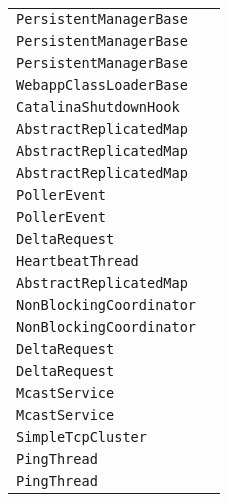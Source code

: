 \begin{center}
\begin{tabular}{ll}
\lstinline/PersistentManagerBase/&\raisebox{0pt}{\lstinline/ startInternal())/}\\ 
\lstinline/PersistentManagerBase/&\raisebox{0pt}{\lstinline/ startInternal())/}\\ 
\lstinline/PersistentManagerBase/&\raisebox{0pt}{\lstinline/ startInternal())/}\\ 
\lstinline/WebappClassLoaderBase/&\raisebox{0pt}{\lstinline/ findClassInternal(String)/}\\ 
\lstinline/CatalinaShutdownHook/&\raisebox{0pt}{\lstinline/ run()/}\\ 
\lstinline/AbstractReplicatedMap/&\raisebox{0pt}{\lstinline/ Vput()/}\\ 
\lstinline/AbstractReplicatedMap/&\raisebox{0pt}{\lstinline/ Vput()/}\\ 
\lstinline/AbstractReplicatedMap/&\raisebox{0pt}{\lstinline/ Vput()/}\\ 
\lstinline/PollerEvent/&\raisebox{0pt}{\lstinline/ run()/}\\ 
\lstinline/PollerEvent/&\raisebox{0pt}{\lstinline/ run()/}\\ 
\lstinline/DeltaRequest/&\raisebox{0pt}{\lstinline/ readExternal(j))/}\\ 
\lstinline/HeartbeatThread/&\raisebox{0pt}{\lstinline/ run()/}\\ 
\lstinline/AbstractReplicatedMap/&\raisebox{0pt}{\lstinline/ Vput()/}\\ 
\lstinline/NonBlockingCoordinator/&\raisebox{0pt}{\lstinline/ fireInterceptorEvent(InterceptorEvent)/}\\ 
\lstinline/NonBlockingCoordinator/&\raisebox{0pt}{\lstinline/ fireInterceptorEvent(InterceptorEvent)/}\\ 
\lstinline/DeltaRequest/&\raisebox{0pt}{\lstinline/ readExternal(java.io.ObjectInput))/}\\ 
\lstinline/DeltaRequest/&\raisebox{0pt}{\lstinline/ readExternal(java.io.ObjectInput))/}\\ 
\lstinline/McastService/&\raisebox{0pt}{\lstinline/ setDomain(byte[])/}\\ 
\lstinline/McastService/&\raisebox{0pt}{\lstinline/ setDomain(byte[])/}\\ 
\lstinline/SimpleTcpCluster/&\raisebox{0pt}{\lstinline/ memberDisappeared(Member)/}\\ 
\lstinline/PingThread/&\raisebox{0pt}{\lstinline/ run()/}\\ 
\lstinline/PingThread/&\raisebox{0pt}{\lstinline/ run()/}\\ 

\end{tabular}
\end{center}
